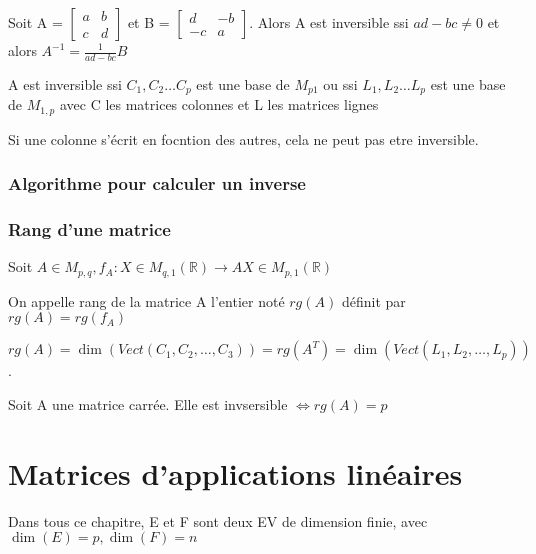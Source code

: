 \documentclass[french]{yLectureNote}
\newcommand{\R}[0]{\mathbb{R}}
\begin{document}
\begin{proposition}
Soit A = \(\begin{bmatrix}a&b\\c&d\end{bmatrix}\) et B =  \(\begin{bmatrix}d&-b\\-c&a\end{bmatrix}\). Alors A est inversible ssi \(ad-bc \neq 0\) et alors \(A^{-1}= \frac{1}{ad-bc}B\)
\end{proposition}
\begin{theorem}
 A est inversible ssi \(C_1,C_2\dots C_p\) est une base de \(M_{p1}\) ou ssi \(L_1,L_2\dots L_p\) est une base de \(M_{1,p}\) avec C les matrices colonnes et L les matrices lignes
\end{theorem}
Si une colonne s'écrit en focntion des autres, cela ne peut pas etre inversible.
\subsection{Algorithme pour calculer un inverse}
\subsection{Rang d'une matrice}
\begin{definition}[Rang]
Soit \(A\in M_{p,q}, f_A : X\in M_{q,1}(\R) \to AX \in M_{p,1}(\R)\)

On appelle rang de la matrice A l'entier noté \(rg(A)\) définit par \(rg(A) = rg(f_A)\)
\end{definition}
\begin{proposition}
\(rg(A) = \dim(Vect(C_1,C_2,\dots,C_3)) = rg(A^T) = \dim(Vect(L_1,L_2,\dots, L_p))\).
\end{proposition}
\begin{proposition}
Soit A une matrice carrée. Elle est invsersible \(\iff rg(A) = p\)
\end{proposition}
\chapter{Matrices d'applications linéaires}
Dans tous ce chapitre, E et F sont deux EV de dimension finie, avec \(\dim(E) = p, \dim(F) = n\)
\end{document}

